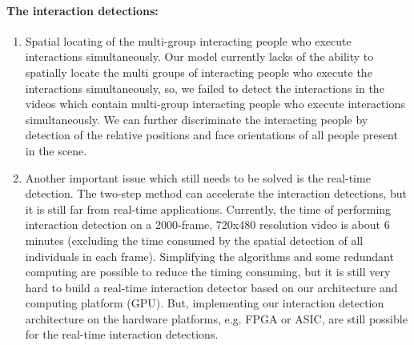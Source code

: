\paragraph{The interaction detections:}
\begin{enumerate}
	\item Spatial locating of the multi-group interacting people who execute interactions simultaneously. Our model currently lacks of the ability to spatially locate the multi groups of interacting people who execute the interactions simultaneously, so, we failed to detect the interactions in the videos which contain multi-group interacting people who execute interactions simultaneously. We can further discriminate the interacting people by detection of the relative positions and face orientations of all people present in the scene. 
	
	\item Another important issue which still needs to be solved is the real-time detection. The two-step method can accelerate the interaction detections, but it is still far from real-time applications. Currently, the time of performing interaction detection on a 2000-frame, 720x480 resolution video is about 6 minutes (excluding the time consumed by the spatial detection of all individuals in each frame). Simplifying the algorithms and some redundant computing are possible to reduce the timing consuming, but it is still very hard to build a real-time interaction detector based on our architecture and computing platform (GPU). But, implementing our interaction detection architecture on the hardware platforms, e.g. FPGA or ASIC, are still possible for the real-time interaction detections.   
\end{enumerate}


